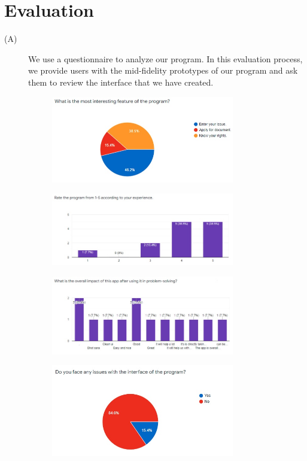 \documentclass[acmtog]{acmart}
\begin{document}
\section{Evaluation}
\begin{description}
    \item[(A)] We use a questionnaire to analyze our program. In this evaluation process, we provide users with the mid-fidelity prototypes of our program and ask them to review the interface that we have created.

    \begin{figure}[H]
        \includegraphics[width=8cm]{Evaluation/q1.jpg}
    \end{figure}
    \begin{figure}[H]
        \includegraphics[width=8cm]{Evaluation/q2.jpg}
    \end{figure}
    \begin{figure}[H]
        \includegraphics[width=8cm]{Evaluation/q3.jpg}
    \end{figure}
    \begin{figure}[H]
        \includegraphics[width=8cm]{Evaluation/q4.jpg}

\end{figure}
\end{description}
\end{document}
